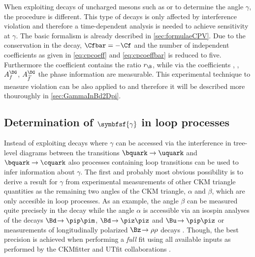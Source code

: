 When exploiting decays of uncharged \B mesons such as \mbox{\BsToDsK} or \mbox{\BdToDpi} to determine the angle $\gamma$, the procedure is different.
This type of decays is only affected by interference \CP violation and therefore a time-dependent analysis is needed to achieve sensitivity at $\gamma$.
The basic formalism is already described in \cref{sec:formulaeCPV}.
Due to the \CP conservation in the decay, $\Cfbar=-\Cf$ and the number of independent coefficients as given in \cref{eq:cpcoeff} and \cref{eq:cpcoeffbar} is reduced to five.
Furthermore the \CP coefficient \Cf contains the ratio $r_\B$, while via the coefficients \Sf, \Sfbar, $A_f^{\DG}$, $A_{\kern 1.5pt\overline{\kern -1.5pt f\kern 1.5pt}}^{\DG}$ the phase information are measurable.
This experimental technique to measure \CP violation can be also applied to \BdToDpi and therefore it will be described more thouroughly in \cref{sec:GammaInBd2Dpi}.

\subsection[head={Determination of $\gamma$ in loop processes},tocentry={Determination of $\gamma$ in loop processes}]{Determination of $\symbfsf{\gamma}$ in loop processes}
\label{sec:gamamInLoops}

Instead of exploiting decays where $\gamma$ can be accessed via the interference in tree-level diagrams between the transitions $\bquark\to\uquark$ and $\bquark\to\cquark$ also processes containing loop transitions can be used to infer information about $\gamma$.
The first and probably most obvious possibility is to derive a result for $\gamma$ from experimental measurements of other CKM triangle quantities as the remaining two angles of the CKM triangle, $\alpha$ and $\beta$, which are only accesible in loop processes.
As an example, the angle $\beta$ can be measured quite precisely in the decay \mbox{\BdToJPsiKS} while the angle $\alpha$ is accessible via an isospin analyses of the decays $\Bd\!\to\pip\pim$, $\Bd\!\to\piz\piz$ and $\Bu\!\to\pip\piz$ \cite{IsospinAlpha} or measurements of longitudinally polarized $\Bz\!\to\rho\rho$ decays \cite{alpha_BaBar, alpha_Belle}. Though, the best precision is achieved when performing a \emph{full} fit using all available inputs as performed by the CKMfitter and UTfit collaborations \cite{CKMfitter2015, UTfit-UT}.

